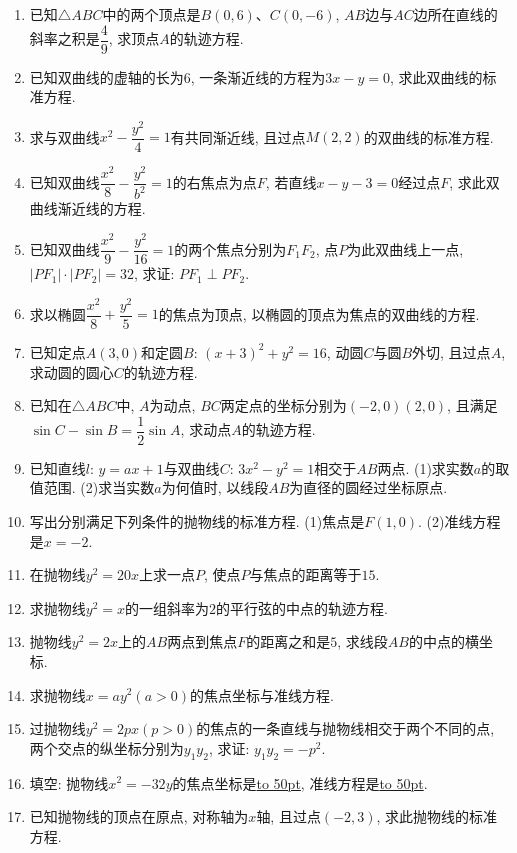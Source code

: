 \documentclass[10pt,a4paper]{article}
\newcommand{\blank}[1]{\underline{\hbox to #1pt{}}}
\newcommand{\bracket}[1]{(\hbox to #1pt{})}
\newcommand{\fourch}[4]{\par\begin{tabular}{p{.23\textwidth}p{.23\textwidth}p{.23\textwidth}p{.23\textwidth}}
A.~#1 &B.~#2& C.~#3& D.~#4
\end{tabular}}
\begin{document}
\begin{enumerate}[1.]
(2)在下列双曲线中, 以$y=\pm \dfrac 12x$为渐近线的是\blank{50}\bracket{20}.
\fourch{$\dfrac{x^2}{16}-\dfrac{y^2}4=1$}{$\dfrac{x^2}4-\dfrac{y^2}{16}=1$}{$\dfrac{x^2}2-y^2=1$}{$x^2-\dfrac{y^2}2=1$}
(3)若方程$4x^2+ky^2=4k$表示双曲线, 则此双曲线的虚轴长等于\blank{50}\bracket{20}.
\fourch{$2\sqrt k$}{$2\sqrt {-k}$}{$\sqrt k$}{$\sqrt {-k}$}
\item 已知$\triangle ABC$中的两个顶点是$B(0,6)$、$C(0,-6)$, $AB$边与$AC$边所在直线的斜率之积是$\dfrac 49$, 求顶点$A$的轨迹方程.
\item 已知双曲线的虚轴的长为$6$, 一条渐近线的方程为$3x-y=0$, 求此双曲线的标准方程.
\item 求与双曲线$x^2-\dfrac{y^2}4=1$有共同渐近线, 且过点$M(2,2)$的双曲线的标准方程.
\item 已知双曲线$\dfrac{x^2}8-\dfrac{y^2}{b^2}=1$的右焦点为点$F$, 若直线$x-y-3=0$经过点$F$, 求此双曲线渐近线的方程.
\item 已知双曲线$\dfrac{x^2}9-\dfrac{y^2}{16}=1$的两个焦点分别为$F_1F_2$, 点$P$为此双曲线上一点, $|PF_1|\cdot|PF_2|=32$, 求证: $PF_1\perp PF_2$.
\item 求以椭圆$\dfrac{x^2}8+\dfrac{y^2}5=1$的焦点为顶点, 以椭圆的顶点为焦点的双曲线的方程.
\item 已知定点$A(3,0)$和定圆$B$: $(x+3)^2+y^2=16$, 动圆$C$与圆$B$外切, 且过点$A$, 求动圆的圆心$C$的轨迹方程.
\item 已知在$\triangle ABC$中, $A$为动点, $BC$两定点的坐标分别为$(-2,0)(2,0)$, 且满足$\sin C-\sin B=\dfrac 12\sin A$, 求动点$A$的轨迹方程.
\item 已知直线$l$: $y=ax+1$与双曲线$C$: $3x^2-y^2=1$相交于$AB$两点.
(1)求实数$a$的取值范围.
(2)求当实数$a$为何值时, 以线段$AB$为直径的圆经过坐标原点.
\item 写出分别满足下列条件的抛物线的标准方程.
(1)焦点是$F(1,0)$.
(2)准线方程是$x=-2$.
\item 在抛物线$y^2=20x$上求一点$P$, 使点$P$与焦点的距离等于$15$.
\item 求抛物线$y^2=x$的一组斜率为$2$的平行弦的中点的轨迹方程.
\item 抛物线$y^2=2x$上的$AB$两点到焦点$F$的距离之和是$5$, 求线段$AB$的中点的横坐标.
\item 求抛物线$x=ay^2(a>0)$的焦点坐标与准线方程.
\item 过抛物线$y^2=2px(p>0)$的焦点的一条直线与抛物线相交于两个不同的点, 两个交点的纵坐标分别为$y_1y_2$, 求证: $y_1y_2=-p^2$.
\item 填空:
抛物线$x^2=-32y$的焦点坐标是\blank{50}, 准线方程是\blank{50}.
\item 已知抛物线的顶点在原点, 对称轴为$x$轴, 且过点$(-2,3)$, 求此抛物线的标准方程.

\end{enumerate}
\end{document}
